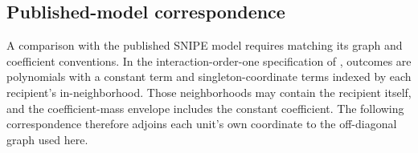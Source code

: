 \documentclass[11pt]{article}
\begin{document}
\subsection{Published-model correspondence}

A comparison with the published SNIPE model requires matching its graph and coefficient conventions. In the interaction-order-one specification of \citet[Sections 3.1--3.2, Assumptions 1--2, equations (3.2)--(3.3)]{CortezRodriguezEichhornYu2023SNIPE}, outcomes are polynomials with a constant term and singleton-coordinate terms indexed by each recipient's in-neighborhood. Those neighborhoods may contain the recipient itself, and the coefficient-mass envelope includes the constant coefficient. The following correspondence therefore adjoins each unit's own coordinate to the off-diagonal graph used here.
\end{document}
